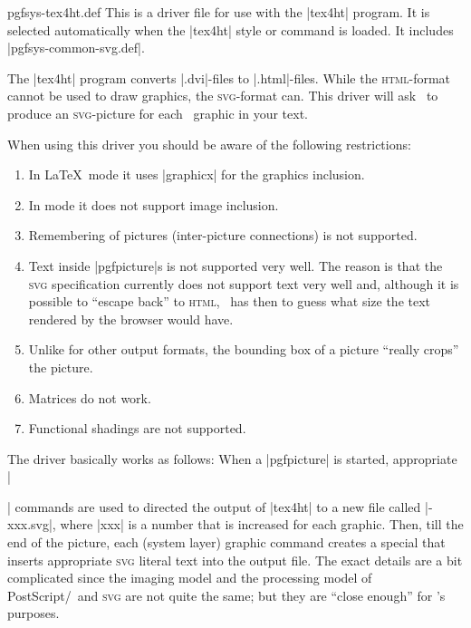 \begin{filedescription}{pgfsys-tex4ht.def}
    This is a driver file for use with the |tex4ht| program. It is selected
    automatically when the |tex4ht| style or command is loaded. It includes
    |pgfsys-common-svg.def|.

    The |tex4ht| program converts |.dvi|-files to |.html|-files. While the
    \textsc{html}-format cannot be used to draw graphics, the
    \textsc{svg}-format can. This driver will ask \pgfname\ to produce an
    \textsc{svg}-picture for each \pgfname\ graphic in your text.

    When using this driver you should be aware of the following restrictions:
    \begin{enumerate}
        \item In \LaTeX\ mode it uses |graphicx| for the graphics inclusion.
        \item In  mode it does not support image inclusion.
        \item Remembering of pictures (inter-picture connections) is not
            supported.
        \item Text inside |pgfpicture|s is not supported very well. The
            reason is that the \textsc{svg} specification currently does not
            support text very well and, although it is  possible to ``escape
            back'' to \textsc{html}, \tikzname\ has then to guess what size
            the text rendered by the browser would have.
        \item Unlike for other output formats, the bounding box of a picture
            ``really crops'' the picture.
        \item Matrices do not work.
        \item Functional shadings are not supported.
    \end{enumerate}

    The driver basically works as follows: When a |{pgfpicture}| is started,
    appropriate |\special| commands are used to directed the output of |tex4ht|
    to a new file called |\jobname-xxx.svg|, where |xxx| is a number that is
    increased for each graphic. Then, till the end of the picture, each (system
    layer) graphic command creates a special that inserts appropriate
    \textsc{svg} literal text into the output file. The exact details are a bit
    complicated since the imaging model and the processing model of
    PostScript/\pdf\ and \textsc{svg} are not quite the same; but they are
    ``close enough'' for \pgfname's purposes.


\end{filedescription}

